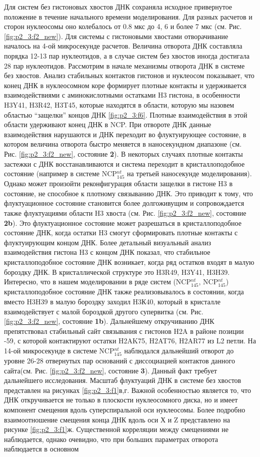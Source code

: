 Для систем без гистоновых хвостов ДНК сохраняла исходное привернутое положение в течение начального времени моделирования. Для разных расчетов и сторон нуклеосомы оно колебалось от 0.8 мкс до 4, 6 и более 7 мкс (см. Рис. \ref{fig:p2_3:f2_new}). Для системы с гистоновыми хвостами отворачивание началось на 4-ой микросекунде расчетов. Величина отворота ДНК составляла порядка 12-13 пар нуклеотидов, а в случае систем без хвостов иногда достигала 28 пар нуклеотидов. Рассмотрим в начале механизмы отворота ДНК в системе без хвостов. Анализ стабильных контактов гистонов и нуклеосом показывает, что конец ДНК в нуклеосомном коре формирует плотные контакты и удерживается взаимодействиями с аминокислотными остатками H3 гистона, в особенности H3Y41, H3R42, H3T45, которые находятся в области, которую мы назовем областью ``защелки'' концов ДНК \ref{fig:p2_3:f6}. Плотные взаимодействия в этой области удерживают конец ДНК в NCP. При отвороте ДНК данные взаимодействия нарушаются и ДНК переходит во флуктуирующее состояние, в котором величина отворота быстро меняется в наносекундном диапазоне (см. Рис. \ref{fig:p2_3:f2_new}, состояние \textbf{2}). В некоторых случаях плотные контакты застежки с ДНК восстанавливаются и система переходит в кристаллоподобное состояние (например в системе NCP$_{145}^{nt}$ на третьей наносекунде моделирования). Однако может произойти реконфигурация области защелки в гистоне H3 в состояние, не способное к плотному связыванию ДНК. Это приводит к тому, что флуктуационное состояние становится более долгоживущим и сопровождается также флуктуациями области H3 хвоста (см. Рис. \ref{fig:p2_3:f2_new}, состояние \textbf{2b}). Это флуктуационное состояние может разрешаться в кристаллоподобное состояние ДНК, когда остатки H3 смогут сформировать плотные контакты с флуктуирующим концом ДНК. Более детальный визуальный анализ взаимодействия гистона H3 с концом ДНК показал, что стабильное кристаллоподобное состояние ДНК возникает, когда ряд остатков входят в малую бороздку ДНК. В кристаллической структуре это H3R49, H3Y41, H3H39. Интересно, что в нашем моделировании в ряде систем (NCP$_{145}^{nt}$, NCP$_{145}^{nt}$) кристаллоподобное состояние ДНК также реализовывалось в состоянии, когда вместо H3H39 в малую бороздку заходил H3К40, который в кристалле взаимодействует с малой бороздкой другого супервитка (см. Рис. \ref{fig:p2_3:f2_new}, состояние \textbf{1b}). Дальнейшему откручиванию ДНК препятствовал стабильный сайт связывания с гистонов H2A в районе позиции -59, с которой контактируют остатки H2AK75, H2AT76, H2AR77 из L2 петли. На 14-ой микросекунде в системе NCP$_{145}^{nt}$ наблюдался дальнейший отворот до уровне 26-28 отвернутых пар оснований с диссоциацией контактов данного сайта(см. Рис. \ref{fig:p2_3:f2_new}, состояние \textbf{3}). Данный факт требует дальнейшего исследования. Масштаб флуктуаций ДНК в системе без хвостов представлен на рисунках \ref{fig:p2_3:f1}в,г. Важной особенностью является то, что ДНК откручивается не только в плоскости нуклеосомного диска, но и имеет компонент смещения вдоль суперспиральной оси нуклеосомы. Более подробно взаимоотношение смещения конца ДНК вдоль оси Х и Z представлено на рисунке \ref{fig:p2_3:f1}ж. Существенной корреляции между смещениями не наблюдается, однако очевидно, что при больших параметрах отворота наблюдается в основном 